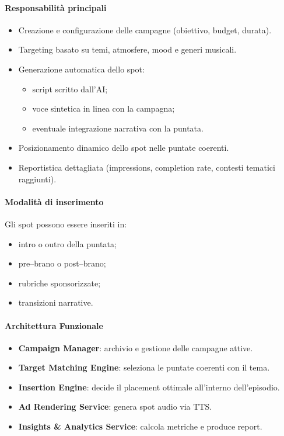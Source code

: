 \documentclass[11pt,a4paper]{article}
\begin{document}
\paragraph{Responsabilità principali}
\begin{itemize}
    \item Creazione e configurazione delle campagne (obiettivo, budget, durata).
    \item Targeting basato su temi, atmosfere, mood e generi musicali.
    \item Generazione automatica dello spot:
    \begin{itemize}
        \item script scritto dall’AI;
        \item voce sintetica in linea con la campagna;
        \item eventuale integrazione narrativa con la puntata.
    \end{itemize}
    \item Posizionamento dinamico dello spot nelle puntate coerenti.
    \item Reportistica dettagliata (impressions, completion rate, contesti tematici raggiunti).
\end{itemize}

\paragraph{Modalità di inserimento}
Gli spot possono essere inseriti in:
\begin{itemize}
    \item intro o outro della puntata;
    \item pre–brano o post–brano;
    \item rubriche sponsorizzate;
    \item transizioni narrative.
\end{itemize}

\paragraph{Architettura Funzionale}
\begin{itemize}
    \item \textbf{Campaign Manager}: archivio e gestione delle campagne attive.
    \item \textbf{Target Matching Engine}: seleziona le puntate coerenti con il tema.
    \item \textbf{Insertion Engine}: decide il placement ottimale all’interno dell’episodio.
    \item \textbf{Ad Rendering Service}: genera spot audio via TTS.
    \item \textbf{Insights \& Analytics Service}: calcola metriche e produce report.
\end{itemize}
\end{document}
